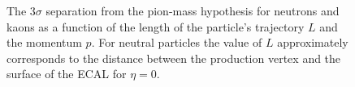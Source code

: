 \begin{figure}
\begin{center}
\end{center}
\caption{
The $3\sigma$ separation from the pion-mass hypothesis for neutrons and kaons as a function of the length of the particle's trajectory $L$ 
 and the momentum $p$.
For neutral particles the value of $L$ approximately corresponds to the distance between the production vertex and the surface of the ECAL for $\eta=0$. 
}
\label{fig:singleparticles}
\end{figure}


